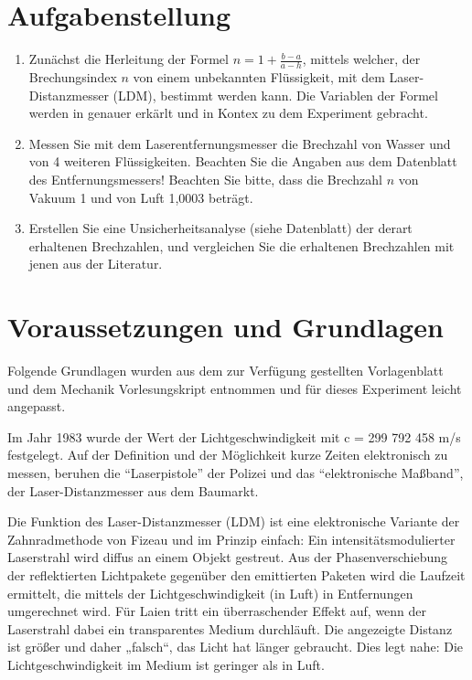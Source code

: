 \documentclass[11pt,ngerman]{scrartcl}
\begin{document}

\tableofcontents
\newpage
\section{Aufgabenstellung}
\label{sec:aufgabenstellung} 

\begin{enumerate}
    \item Zunächst die Herleitung der Formel $n = 1 + \frac{b-a}{a-h}$, mittels
        welcher, der Brechungsindex $n$ von einem unbekannten Flüssigkeit, mit
        dem Laser-Distanzmesser (LDM), bestimmt werden kann.  Die Variablen der
        Formel werden in  genauer
        erkärlt und in Kontex zu dem Experiment gebracht.  
    \item Messen Sie mit dem Laserentfernungsmesser die Brechzahl von Wasser
        und von 4 weiteren Flüssigkeiten. Beachten Sie die Angaben aus dem
        Datenblatt des Entfernungsmessers! Beachten Sie bitte, dass die
        Brechzahl $n$ von Vakuum 1 und von Luft 1,0003 beträgt.  
    \item Erstellen Sie eine Unsicherheitsanalyse (siehe Datenblatt) der derart
        erhaltenen Brechzahlen, und vergleichen Sie die erhaltenen Brechzahlen
        mit jenen aus der Literatur.
\end{enumerate}

\section{Voraussetzungen und Grundlagen} \label{sec:voraussetzungen_grundlagen}
Folgende Grundlagen wurden aus dem zur Verfügung gestellten Vorlagenblatt
\cite{vorlageentfernung2021} und dem Mechanik Vorlesungskript \cite{Knoll2020}
entnommen und für dieses Experiment leicht angepasst.

Im Jahr 1983 wurde der Wert der Lichtgeschwindigkeit mit c = 299 792 458 m/s
festgelegt. Auf der Definition und der Möglichkeit kurze Zeiten elektronisch zu
messen, beruhen die ``Laserpistole'' der Polizei und das ``elektronische Maßband'',
der Laser-Distanzmesser aus dem Baumarkt.

Die Funktion des Laser-Distanzmesser (LDM) ist eine elektronische Variante der
Zahnradmethode von Fizeau und im Prinzip einfach: Ein intensitätsmodulierter
Laserstrahl wird diffus an einem Objekt gestreut. Aus der Phasenverschiebung
der reflektierten Lichtpakete gegenüber den emittierten Paketen wird die
Laufzeit ermittelt, die mittels der Lichtgeschwindigkeit (in Luft) in
Entfernungen umgerechnet wird. Für Laien tritt ein überraschender Effekt auf,
wenn der Laserstrahl dabei ein transparentes Medium durchläuft. Die angezeigte
Distanz ist größer und daher „falsch“, das Licht hat länger gebraucht. Dies
legt nahe: Die Lichtgeschwindigkeit im Medium ist geringer als in Luft.
\end{document}

